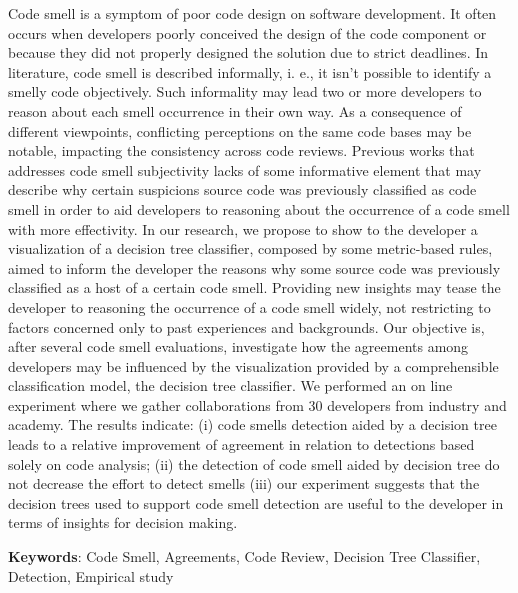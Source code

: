 \vspace{2.2cm}

\begin{center}
\end{center}

\vspace{1.6cm}

\noindent Code smell is a symptom of poor code design on software development. It often occurs when developers poorly conceived the design of the code component or because they did not properly designed the solution due to strict deadlines. In literature, code smell is described informally, i. e., it isn't possible to identify a smelly code objectively. Such informality may lead two or more developers to reason about each smell occurrence in their own way. As a consequence of different viewpoints, conflicting perceptions on the same code bases may be notable, impacting the consistency across code reviews. Previous works that addresses code smell subjectivity lacks of some informative element that may describe why certain suspicions source code was previously classified as code smell in order to aid developers to reasoning about the occurrence of a code smell with more effectivity. In our research, we propose to show to the developer a visualization of a decision tree classifier, composed by some metric-based rules, aimed to inform the developer the reasons why some source code was previously classified as a host of a certain code smell. Providing new insights may tease the developer to reasoning the occurrence of a code smell widely, not restricting to factors concerned only to past experiences and backgrounds. Our objective is, after several code smell evaluations, investigate how the agreements among developers may be influenced by the visualization provided by a comprehensible classification model, the decision tree classifier. We performed an on line experiment where we gather collaborations from 30  developers from industry and academy. The results indicate: (i) code smells detection aided by a decision tree leads to a relative improvement of agreement in relation to detections based solely on code analysis; (ii) the detection of code smell aided by decision tree do not decrease the effort to detect smells (iii) our experiment suggests that the decision trees used to support code smell detection are useful to the developer in terms of insights for decision making.
 
 
\vspace*{0.5cm}\noindent\textbf{Keywords}: Code Smell, Agreements, Code Review, Decision Tree Classifier, Detection, Empirical study